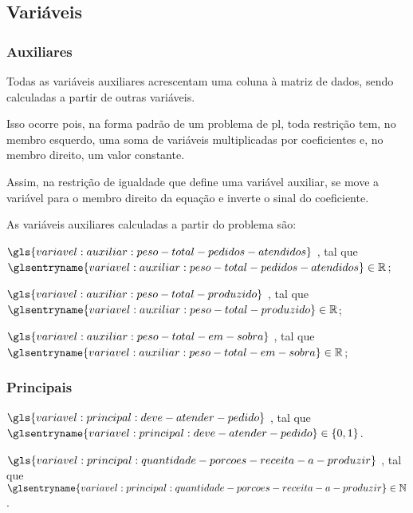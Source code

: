 \subsection{Variáveis}

\subsubsection{Auxiliares}

Todas as variáveis auxiliares acrescentam uma coluna à matriz de dados, sendo calculadas a partir de outras variáveis.

Isso ocorre pois, na forma padrão de um problema de \gls{pl}, toda restrição tem, no membro esquerdo, uma soma de variáveis multiplicadas por coeficientes e, no membro direito, um valor constante.

Assim, na restrição de igualdade que define uma variável auxiliar, se move a variável para o membro direito da equação e inverte o sinal do coeficiente.

As variáveis auxiliares calculadas a partir do problema são:

\begin{symbols}
    \item[\( \gls{variavel:auxiliar:peso-total-pedidos-atendidos} \)]
    ,
    tal que \( \glsentryname{variavel:auxiliar:peso-total-pedidos-atendidos} \in \mathbb{R} \);

    \item[\( \gls{variavel:auxiliar:peso-total-produzido} \)]
    ,
    tal que \( \glsentryname{variavel:auxiliar:peso-total-produzido} \in \mathbb{R} \);

    \item[\( \gls{variavel:auxiliar:peso-total-em-sobra} \)]
    ,
    tal que \( \glsentryname{variavel:auxiliar:peso-total-em-sobra} \in \mathbb{R} \);
\end{symbols}

\subsubsection{Principais}

\begin{symbols}
    \item[\( \gls{variavel:principal:deve-atender-pedido} \)]
    ,
    tal que \(  \glsentryname{variavel:principal:deve-atender-pedido} \in \{0, 1\} \).

    \item[\( \gls{variavel:principal:quantidade-porcoes-receita-a-produzir} \)]
    ,
    tal que \(  \glsentryname{variavel:principal:quantidade-porcoes-receita-a-produzir} \in \mathbb{N} \).
\end{symbols}


